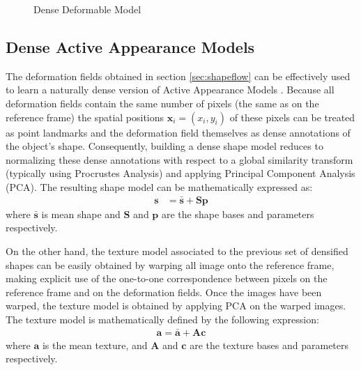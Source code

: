 \begin{figure}[h!]
\begin{subfigure}[b]{0.22\textwidth}
    \end{subfigure}
    \caption{Dense Deformable Model}
    \label{fig:models}
\end{figure}


\subsection{Dense Active Appearance Models}

The deformation fields obtained in section \ref{sec:shapeflow} can be effectively used to learn a naturally dense version of Active Appearance Models \cite{Cootes2001, Matthews2004}. Because all deformation fields contain the same number of pixels (the same as on the reference frame) the spatial positions $\mathbf{x}_i=(x_i, y_i)$ of these pixels can be treated as point landmarks and the deformation field themselves as dense annotations of the object's shape. Consequently, building a dense shape model reduces to normalizing these dense annotations with respect to a global similarity transform (typically using Procrustes Analysis) and applying Principal Component Analysis (PCA). The resulting shape model can be mathematically expressed as:
\begin{equation}
    \begin{aligned}
        \mathbf{s} & = \mathbf{\bar{s}} + \mathbf{S} \mathbf{p}
    \end{aligned}
    \label{eq:shape_model}
\end{equation}
where $\mathbf{\bar{s}}$ is mean shape and $\mathbf{S}$ and $\mathbf{p}$ are the shape bases and parameters respectively.

On the other hand, the texture model associated to the previous set of densified shapes can be easily obtained by warping all image onto the reference frame, making explicit use of the one-to-one correspondence between pixels on the reference frame and on the deformation fields. Once the images have been warped, the texture model is obtained by applying PCA on the warped images. The texture model is mathematically defined by the following expression:
\begin{equation}
    \begin{aligned}
        \mathbf{a} = \mathbf{\bar{a}} + \mathbf{A} \mathbf{c}
    \end{aligned}
	\label{eq:tex_model}
\end{equation}
where $\mathbf{a}$ is the mean texture, and $\mathbf{A}$ and $\mathbf{c}$ are the texture bases and parameters respectively.

